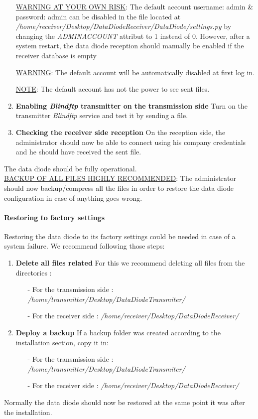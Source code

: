 \documentclass[a4paper,10pt]{article}
\begin{document}
\begin{enumerate}
\underline{WARNING AT YOUR OWN RISK}: The default account username: admin \& password: admin can be disabled in the file located at \emph{/home/receiver/Desktop/DataDiodeReceiver/DataDiode/settings.py} by changing the \emph{ADMINACCOUNT} attribut to 1 instead of 0. However, after a system restart, the data diode reception should manually be enabled if the receiver database is empty

\underline{WARNING}: The default account will be automatically disabled at first log in.

\underline{NOTE}: The default account has not the power to see sent files.

\item \textbf{Enabling \emph{Blindftp} transmitter on the transmission side} Turn on the transmitter \emph{Blindftp} service and test it by sending a file.

\item \textbf{Checking the receiver side reception} On the reception side, the administrator should now be able to connect using his company credentials and he should have received the sent file.

\end{enumerate}
The data diode should be fully operational. \\  
\underline{BACKUP OF ALL FILES HIGHLY RECOMMENDED}: The administrator should now backup/compress all the files in order to restore the data diode configuration in case of anything goes wrong.
\paragraph{Restoring to factory settings}
Restoring the data diode to its factory settings could be needed in case of a system failure. We recommend following those steps:

\begin{enumerate}
\item \textbf{Delete all files related}
	For this we recommend deleting all files from the directories  :
\begin{enumerate}
\item[-] For the transmission side : \emph{/home/transmitter/Desktop/DataDiodeTransmiter/}
\item[-] For the receiver side : \emph{/home/receiver/Desktop/DataDiodeReceiver/}
\end{enumerate}

\item \textbf{Deploy a backup} 
If a backup folder was created according to the installation section, copy it in:
\begin{enumerate}
\item[-] For the transmission side : \emph{/home/transmitter/Desktop/DataDiodeTransmiter/}
\item[-] For the receiver side : \emph{/home/receiver/Desktop/DataDiodeReceiver/}
\end{enumerate}

\end{enumerate}
Normally the data diode should now be restored at the same point it was after the installation.
\bigskip
\end{document}
